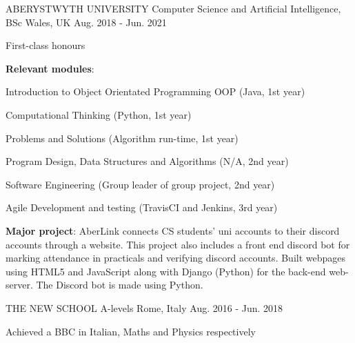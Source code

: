 

\begin{cventries}

  \cventry
    {ABERYSTWYTH UNIVERSITY} %
    {Computer Science and Artificial Intelligence, BSc} %
    {Wales, UK} %
    {Aug. 2018 - Jun. 2021} %
    {
      \begin{cvitems} %
        \item {First-class honours}
        \item {\textbf{Relevant modules}:}\\
        \begin{cvitems}
          \item {Introduction to Object Orientated Programming OOP (Java, 1st year)}
          \item {Computational Thinking (Python, 1st year)}
          \item {Problems and Solutions (Algorithm run-time, 1st year)}
          \item {Program Design, Data Structures and Algorithms (N/A, 2nd year)}
          \item {Software Engineering (Group leader of group project, 2nd year)}
          \item {Agile Development and testing (TravisCI and Jenkins, 3rd year)}\\
        \end{cvitems}
        \item {\textbf{Major project}: AberLink connects CS students' uni accounts to their discord accounts through a website. This project also includes a front end discord bot for marking attendance in practicals and verifying discord accounts. Built webpages using HTML5 and JavaScript along with Django (Python) for the back-end web-server. The Discord bot is made using Python.}
      \end{cvitems}
    }
    
  \cventry
    {THE NEW SCHOOL} %
    {A-levels} %
    {Rome, Italy} %
    {Aug. 2016 - Jun. 2018} %
    {
      \begin{cvitems} %
        \item {Achieved a BBC in Italian, Maths and Physics respectively}
      \end{cvitems}
    }
    

\end{cventries}
